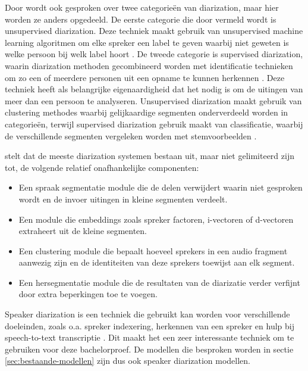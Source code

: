 Door \textcite{Khoma2023} wordt ook gesproken over twee categorieën van diarization, maar hier worden ze anders opgedeeld. De eerste categorie die door \textcite{Khoma2023} vermeld wordt is unsupervised diarization. Deze techniek maakt gebruik van unsupervised machine learning algoritmen om elke spreker een label te geven waarbij niet geweten is welke persoon bij welk label hoort \autocite{Khoma2023}. De tweede categorie is supervised diarization, waarin diarization methoden gecombineerd worden met identificatie technieken om zo een of meerdere personen uit een opname te kunnen herkennen \autocite{Khoma2023}. Deze techniek heeft als belangrijke eigenaardigheid dat het nodig is om de uitingen van meer dan een persoon te analyseren\autocite{Khoma2023}. Unsupervised diarization maakt gebruik van clustering methodes waarbij gelijkaardige segmenten onderverdeeld worden in categorieën, terwijl supervised diarization gebruik maakt van classificatie, waarbij de verschillende segmenten vergeleken worden met stemvoorbeelden \autocite{Khoma2023}.

\textcite{Zhang2018} stelt dat de meeste diarization systemen bestaan uit, maar niet gelimiteerd zijn tot, de volgende relatief onafhankelijke componenten:
\begin{itemize}
	\item Een spraak segmentatie module die de delen verwijdert waarin niet gesproken wordt en de invoer uitingen in kleine segmenten verdeelt.
	\item Een module die embeddings zoals spreker factoren, i-vectoren of d-vectoren extraheert uit de kleine segmenten.
	\item Een clustering module die bepaalt hoeveel sprekers in een audio fragment aanwezig zijn en de identiteiten van deze sprekers toewijst aan elk segment.
	\item Een hersegmentatie module die de resultaten van de diarizatie verder verfijnt door extra beperkingen toe te voegen.
\end{itemize}

Speaker diarization is een techniek die gebruikt kan worden voor verschillende doeleinden, zoals o.a. spreker indexering, herkennen van een spreker en hulp bij speech-to-text transcriptie \autocite{AngueraMiro2012}. Dit maakt het een zeer interessante techniek om te gebruiken voor deze bachelorproef. De modellen die besproken worden in sectie \ref{sec:bestaande-modellen} zijn dus ook speaker diarization modellen.

